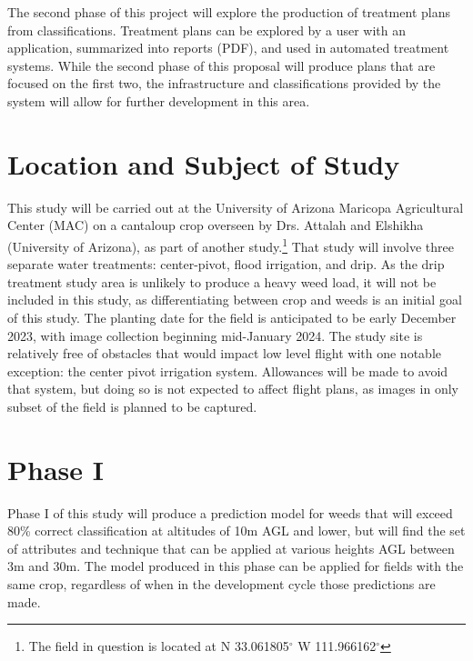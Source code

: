 \documentclass[12pt]{article}
\begin{document}
 The second phase of this project will explore the production of treatment plans from classifications. Treatment plans can be explored by a user with an application, summarized into reports (PDF), and used in automated treatment systems.  While the second phase of this proposal will  produce plans that are focused on the first two, the infrastructure and classifications provided by the system will allow for further development in this area.

\section{Location and Subject of Study}
This study will be carried out at the University of Arizona Maricopa Agricultural Center (MAC) on a cantaloup crop overseen by Drs. Attalah and Elshikha (University of Arizona), as part of another study.\footnote{The field in question is located at N 33.061805$^{\circ}$ W 111.966162$^{\circ}$} That study will involve three separate water treatments: center-pivot, flood irrigation, and drip. As the drip treatment study area is unlikely to produce a heavy weed load, it will not be included in this study, as differentiating between crop and weeds is an initial goal of this study. The planting date for the field is anticipated to be early December 2023, with image collection beginning mid-January 2024. The study site is relatively free of obstacles that would impact low level flight with one notable exception: the center pivot irrigation system. Allowances will be made to avoid that system, but doing so is not expected to affect flight plans, as images in only subset of the field is planned to be captured.
 
\section{Phase I}
Phase I of this study will produce a prediction model for weeds that will exceed 80\% correct classification at altitudes of 10m AGL and lower, but will find the set of attributes and technique that can be applied at various heights AGL between 3m and 30m. The model produced in this phase can be applied for fields with the same crop, regardless of when in the development cycle those predictions are made. 
\end{document}
